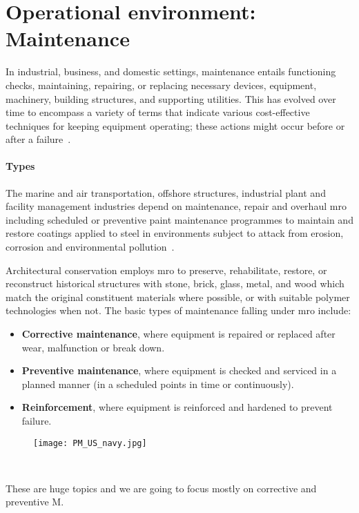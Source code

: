 \section{Operational environment: Maintenance}
In industrial, business, and domestic settings, maintenance entails functioning checks, maintaining, repairing,
or replacing necessary devices, equipment,  machinery, building structures, and supporting utilities.
This has evolved over time to encompass a variety of terms that indicate various cost-effective techniques for keeping equipment operating;
these actions might occur before or after a failure~\cite{Misc:maintenance_2016_efnms}. %

\paragraph{Types}
The marine and air transportation, offshore structures, industrial plant and facility management industries depend on maintenance,
repair and overhaul \acs{mro} including scheduled or preventive paint maintenance programmes to maintain and restore coatings applied
to steel in environments subject to attack from erosion, corrosion and environmental pollution~\cite{Report:iso_2018_paints}.

Architectural conservation employs \ac{mro} to preserve, rehabilitate, restore, or reconstruct historical structures with stone,
brick, glass, metal, and wood which match the original constituent materials where possible, or with suitable polymer technologies when not.
The basic types of maintenance falling under \acs{mro} include:
\begin{itemize}
    \item \textbf{Corrective maintenance}, where equipment is repaired or replaced after wear, malfunction or break down.
    \item \textbf{Preventive maintenance}, where equipment is checked and serviced in a planned manner (in a scheduled points in time or continuously).
    \item \textbf{Reinforcement}, where equipment is reinforced and hardened to prevent failure.
\end{itemize}
\begin{figure}[t]
    \centering
    \texttt{[image: PM\_US\_navy.jpg]}
    \caption{~\cite{file:boat_2016_uss}}
    \label{fig:boat_us_navy}
\end{figure}
These are huge topics and we are going to focus mostly on corrective and preventive M.


